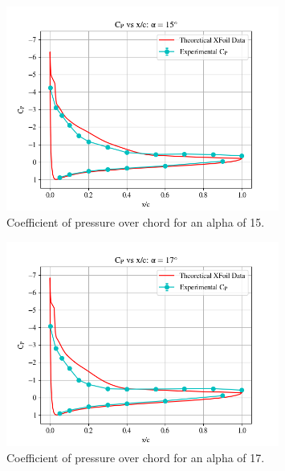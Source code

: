 \documentclass[11pt, letterpaper]{article}
\begin{document}
\begin{appendices}
\begin{figure}[!hpt]
        \centering        
        \includegraphics[width=0.8\textwidth]{Figures/C_p-a15.png}
        \caption{Coefficient of pressure over chord for an alpha of 15\degree.}
        \label{fig:C_p-a15}
\end{figure}

\begin{figure}[!hpt]
        \centering        
        \includegraphics[width=0.8\textwidth]{Figures/C_p-a17.png}
        \caption{Coefficient of pressure over chord for an alpha of 17\degree.}
        \label{fig:C_p-a17}
\end{figure}



\end{appendices}
\end{document}
